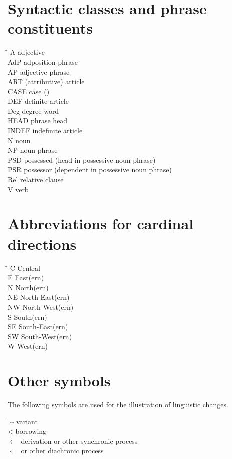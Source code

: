 \section{Syntactic classes and phrase constituents}
\begin{tabbing}
\TABh \= \kill
{A} \> adjective\\
{AdP} \> adposition phrase\\
{AP} \> adjective phrase\\
{ART} \> (attributive) article\\
{CASE} \> case ()\\
{DEF} \> definite article\\
{Deg} \> degree word\\
{HEAD} \> phrase head\\
{INDEF} \> indefinite article\\
{N} \> noun\\
{NP} \> noun phrase\\
{PSD} \> possessed (head in possessive noun phrase)\\ 
{PSR} \> possessor (dependent in possessive noun phrase)\\
{Rel} \> relative clause\\
{V} \> verb
\end{tabbing}

\section{Abbreviations for cardinal directions}
\begin{multicols}{2}
\begin{tabbing}
\TABh \= \kill
{C} \> Central\\
{E} \> East(ern)\\
{N} \> North(ern)\\
{NE} \> North-East(ern)\\
{NW} \> North-West(ern)\\
{S} \> South(ern)\\
{SE} \> South-East(ern)\\
{SW} \> South-West(ern)\\
{W} \> West(ern)
\end{tabbing}
\end{multicols}

\section{Other symbols}
The following symbols are used for the illustration of linguistic changes.
\begin{tabbing}
\TABh \= \kill
\textasciitilde \> variant\\
<  \> borrowing\\
$\leftarrow$  \> derivation or other synchronic process\\
$\Leftarrow$  \>  or other diachronic process\footnotemark
\end{tabbing}

